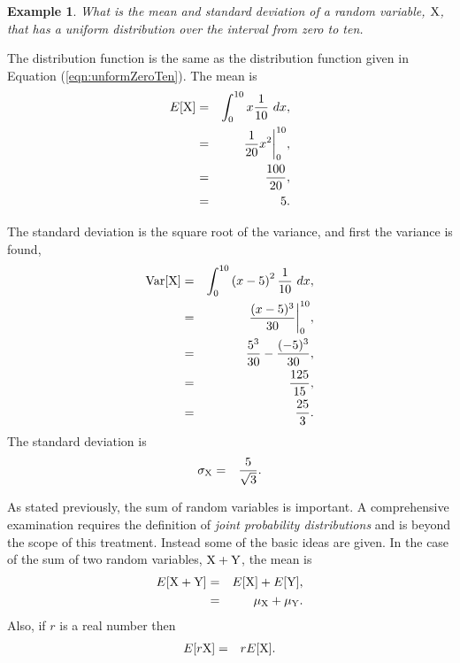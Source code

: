 \documentclass[12pt]{article}
\newtheorem{example}{Example}[section]
\newcommand{\lp}{\left(}
\newcommand{\rp}{\right)}
\begin{document}
\begin{example}
  What is the mean and standard deviation of a random variable, ${\rm
    X}$, that has a uniform distribution over the interval from zero
  to ten.
\end{example}

The distribution function is the same as the distribution function
given in Equation (\ref{eqn:unformZeroTen}). The mean is
\begin{eqnarray*}
  E[{\rm X}] & = & \int^{10}_0 x \frac{1}{10} ~ dx, \\
  & = & \frac{1}{20} x^2 \bigg|^{10}_0, \\
  & = & \frac{100}{20}, \\
  & = & 5.
\end{eqnarray*}

The standard deviation is the square root of the variance, and first
the variance is found,
\begin{eqnarray*}
  \mathrm{Var}[{\rm X}] & = & 
  \int^{10}_0 \lp x-5 \rp^2 \frac{1}{10} ~ dx, \\
  & = & \frac{(x-5)^3}{30} \bigg|^{10}_0, \\
  & = & \frac{5^3}{30} - \frac{(-5)^3}{30}, \\
  & = & \frac{125}{15}, \\
  & = & \frac{25}{3}.
\end{eqnarray*}
The standard deviation is 
\begin{eqnarray*}
  \sigma_{\rm X} & = & \frac{5}{\sqrt{3}}.
\end{eqnarray*}



As stated previously, the sum of random variables is important. A
comprehensive examination requires the definition of \textit{joint
  probability distributions} and is beyond the scope of this
treatment. Instead some of the basic ideas are given. In the case of
the sum of two random variables, ${\rm X}+{\rm Y}$, the mean is
\begin{eqnarray*}
  E[{\rm X}+{\rm Y}] & = & E[{\rm X}] + E[{\rm Y}], \\
  & = & \mu_{\rm X} + \mu_{\rm Y}.
\end{eqnarray*}
Also, if $r$ is a real number then
\begin{eqnarray*}
  E[r{\rm X}] & = & r E[{\rm X}].
\end{eqnarray*}
\end{document}
